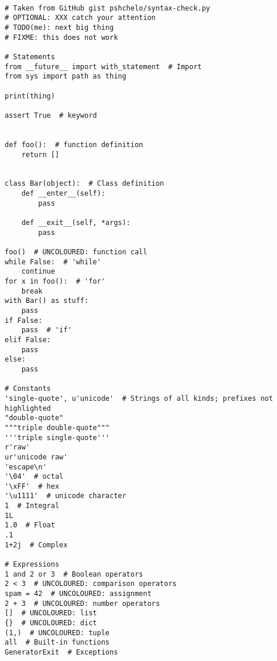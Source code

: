 \documentclass[
    fontsize=11pt,
    paper=A4,
    pagesize,
    parskip=never,
    ]{scrartcl}
\begin{document}
\begin{verbatim}

# Taken from GitHub gist pshchelo/syntax-check.py
# OPTIONAL: XXX catch your attention
# TODO(me): next big thing
# FIXME: this does not work

# Statements
from __future__ import with_statement  # Import
from sys import path as thing

print(thing)

assert True  # keyword


def foo():  # function definition
    return []


class Bar(object):  # Class definition
    def __enter__(self):
        pass

    def __exit__(self, *args):
        pass

foo()  # UNCOLOURED: function call
while False:  # 'while'
    continue
for x in foo():  # 'for'
    break
with Bar() as stuff:
    pass
if False:
    pass  # 'if'
elif False:
    pass
else:
    pass

# Constants
'single-quote', u'unicode'  # Strings of all kinds; prefixes not highlighted
"double-quote"
"""triple double-quote"""
'''triple single-quote'''
r'raw'
ur'unicode raw'
'escape\n'
'\04'  # octal
'\xFF'  # hex
'\u1111'  # unicode character
1  # Integral
1L
1.0  # Float
.1
1+2j  # Complex

# Expressions
1 and 2 or 3  # Boolean operators
2 < 3  # UNCOLOURED: comparison operators
spam = 42  # UNCOLOURED: assignment
2 + 3  # UNCOLOURED: number operators
[]  # UNCOLOURED: list
{}  # UNCOLOURED: dict
(1,)  # UNCOLOURED: tuple
all  # Built-in functions
GeneratorExit  # Exceptions
\end{verbatim}
\end{document}
